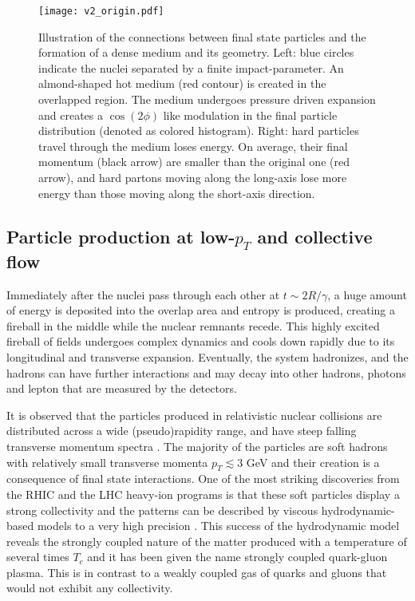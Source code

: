 \begin{figure}
\singlespacing 
\centering
\texttt{[image: v2\_origin.pdf]}
\caption[Illustration of the connections between final state particles and]{Illustration of the connections between final state particles and the formation of a dense medium and its geometry. Left: blue circles indicate the nuclei separated by a finite impact-parameter. An almond-shaped hot medium (red contour) is created in the overlapped region. The medium undergoes pressure driven expansion and creates a $\cos(2\phi)$ like modulation in the final particle distribution (denoted as colored histogram). Right: hard particles travel through the medium loses energy. On average, their final momentum (black arrow) are smaller than the original one (red arrow), and hard partons moving along the long-axis lose more energy than those moving along the short-axis direction.}
\label{fig:v2_demo}
\end{figure}


\subsection{Particle production at low-$p_T$ and collective flow} 
Immediately after the nuclei pass through each other at $t\sim 2R/\gamma$, a huge amount of energy is deposited into the overlap area and entropy is produced, creating a fireball in the middle while the nuclear remnants recede.
This highly excited fireball of fields undergoes complex dynamics and cools down rapidly due to its longitudinal and transverse expansion.
Eventually, the system hadronizes, and the hadrons can have further interactions and may decay into other hadrons, photons and lepton that are measured by the detectors.

It is observed that the particles produced in relativistic nuclear collisions are distributed across a wide (pseudo)rapidity range, and have steep falling transverse momentum spectra \cite{Adler:2003cb,Abelev:2012hxa,ALICE:2015kda}.
The majority of the particles are soft hadrons with relatively small transverse momenta $p_T \lesssim 3$ GeV and their creation is a consequence of final state interactions.
One of the most striking discoveries from the RHIC and the LHC heavy-ion programs is that these soft particles display a strong collectivity and the patterns can be described by viscous hydrodynamic-based models to a very high precision \cite{Dusling:2007gi,Song:2008si,Schenke:2010nt,Petersen:2008dd,Niemi:2015qia,Bernhard:2016tnd,Bernhard:2018hnz}.
This success of the hydrodynamic model reveals the strongly coupled nature of the matter produced with a temperature of several times $T_c$ and it has been given the name strongly coupled quark-gluon plasma.
This is in contrast to a weakly coupled gas of quarks and gluons that would not exhibit any collectivity.

